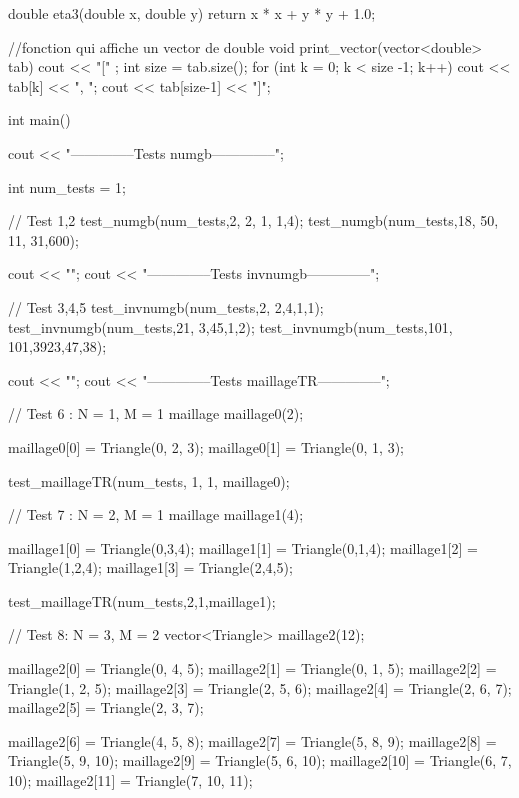 \begin{codeblock}
double eta3(double x, double y) {
    return x * x + y * y + 1.0;
}

//fonction qui affiche un vector de double
void print_vector(vector<double> tab){
    cout << "[" ;
    int size = tab.size();
    for (int k = 0; k < size -1; k++) cout << tab[k] << ", ";
    cout << tab[size-1] << "]\n";
}



int main(){
    cout << "--------------Tests numgb--------------\n";

    int num_tests = 1;

    // Test 1,2
    test_numgb(num_tests,2, 2, 1, 1,4);
    test_numgb(num_tests,18, 50, 11, 31,600);


    cout << "\n\n\n";
    cout << "--------------Tests invnumgb--------------\n";

    // Test 3,4,5
    test_invnumgb(num_tests,2, 2,4,{1,1});
    test_invnumgb(num_tests,21, 3,45,{1,2});
    test_invnumgb(num_tests,101, 101,3923,{47,38});



    cout << "\n\n\n";
    cout << "--------------Tests maillageTR--------------\n";



    // Test 6 : N = 1, M = 1
    maillage maillage0(2);

    maillage0[0] = Triangle(0, 2, 3);
    maillage0[1] = Triangle(0, 1, 3);

    test_maillageTR(num_tests, 1, 1, maillage0);



    // Test 7 : N = 2, M = 1
    maillage maillage1(4);

    maillage1[0] = Triangle(0,3,4);
    maillage1[1] = Triangle(0,1,4);
    maillage1[2] = Triangle(1,2,4);
    maillage1[3] = Triangle(2,4,5);

    test_maillageTR(num_tests,2,1,maillage1);



    // Test 8: N = 3, M = 2
    vector<Triangle> maillage2(12);

    maillage2[0] = Triangle(0, 4, 5);
    maillage2[1] = Triangle(0, 1, 5);
    maillage2[2] = Triangle(1, 2, 5);
    maillage2[3] = Triangle(2, 5, 6);
    maillage2[4] = Triangle(2, 6, 7);
    maillage2[5] = Triangle(2, 3, 7);

    maillage2[6] = Triangle(4, 5, 8);
    maillage2[7] = Triangle(5, 8, 9);
    maillage2[8] = Triangle(5, 9, 10);
    maillage2[9] = Triangle(5, 6, 10);
    maillage2[10] = Triangle(6, 7, 10);
    maillage2[11] = Triangle(7, 10, 11);

}
\end{codeblock}
